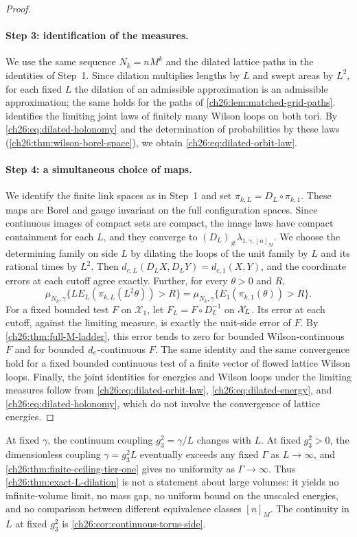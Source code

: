 \begin{proof}
\paragraph{Step 3: identification of the measures.}
We use the same sequence $N_k=nM^k$ and the dilated lattice paths in the identities of Step~1. Since dilation multiplies lengths by $L$ and swept areas by $L^2$, for each fixed $L$ the dilation of an admissible approximation is an admissible approximation; the same holds for the paths of \cref{ch26:lem:matched-grid-paths}.  identifies the limiting joint laws of finitely many Wilson loops on both tori. By \eqref{ch26:eq:dilated-holonomy} and the determination of probabilities by these laws (\cref{ch26:thm:wilson-borel-space}), we obtain \eqref{ch26:eq:dilated-orbit-law}.

\paragraph{Step 4: a simultaneous choice of maps.}
We identify the finite link spaces as in Step~1 and set $\pi_{k,L}=D_L\circ\pi_{k,1}$. These maps are Borel and gauge invariant on the full configuration spaces. Since continuous images of compact sets are compact, the image laws have compact containment for each $L$, and they converge to $(D_L)_\#\lambda_{1,\gamma,[n]_M}$. We choose the determining family on side $L$ by dilating the loops of the unit family by $L$ and its rational times by $L^2$. Then $d_{c,L}(D_LX,D_LY)=d_{c,1}(X,Y)$, and the coordinate errors at each cutoff agree exactly. Further, for every $\theta>0$ and $R$,
\[
 \mu_{N_k,\gamma}\{LE_L(\pi_{k,L}(L^2\theta))>R\}=\mu_{N_k,\gamma}\{E_1(\pi_{k,1}(\theta))>R\}.
\]
For a fixed bounded test $F$ on $\mathcal X_1$, let $F_L=F\circ D_L^{-1}$ on $\mathcal X_L$. Its error at each cutoff, against the limiting measure, is exactly the unit-side error of $F$. By \cref{ch26:thm:full-M-ladder}, this error tends to zero for bounded Wilson-continuous $F$ and for bounded $d_c$-continuous $F$. The same identity and the same convergence hold for a fixed bounded continuous test of a finite vector of flowed lattice Wilson loops. Finally, the joint identities for energies and Wilson loops under the limiting measures follow from \eqref{ch26:eq:dilated-orbit-law}, \eqref{ch26:eq:dilated-energy}, and \eqref{ch26:eq:dilated-holonomy}, which do not involve the convergence of lattice energies.
\end{proof}

\begin{remark}\label{ch26:rem:dilation-scope}
At fixed $\gamma$, the continuum coupling $g_3^2=\gamma/L$ changes with $L$. At fixed $g_3^2>0$, the dimensionless coupling $\gamma=g_3^2L$ eventually exceeds any fixed $\Gamma$ as $L\to\infty$, and \cref{ch26:thm:finite-ceiling-tier-one} gives no uniformity as $\Gamma\to\infty$. Thus \cref{ch26:thm:exact-L-dilation} is not a statement about large volumes: it yields no infinite-volume limit, no mass gap, no uniform bound on the unscaled energies, and no comparison between different equivalence classes $[n]_M$. The continuity in $L$ at fixed $g_3^2$ is \cref{ch26:cor:continuous-torus-side}.
\end{remark}

